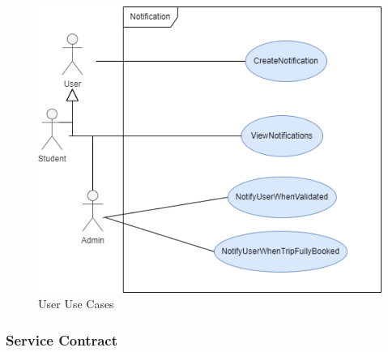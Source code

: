 \documentclass[hidelinks, 12pt, a4paper]{article}
\begin{document}
                    \begin{figure}[H]
                    
                        \centering
                        \includegraphics[]{images/Notification Usecase.drawio.png}
                        \caption{User Use Cases}
                        \label{fig:User UseCases}
                        
                    \end{figure}
   \newpage                 
                \subsubsection{Service Contract}
            
\end{document}
